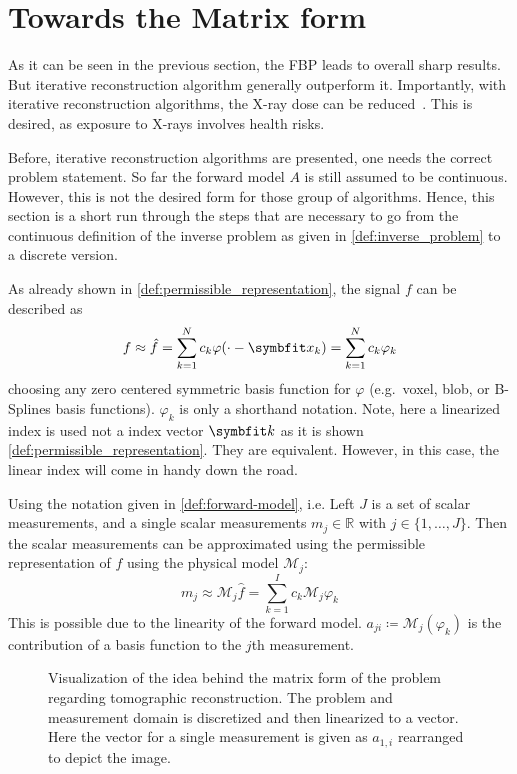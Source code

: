 \section{Towards the Matrix form}\label{sec:matrix_formulation}

As it can be seen in the previous section, the \gls{FBP} leads to overall sharp results. But
iterative reconstruction algorithm generally outperform it. Importantly, with iterative
reconstruction algorithms, the X-ray dose can be reduced~\cite{willemink_evolution_2019}. This is
desired, as exposure to X-rays involves health risks.

Before, iterative reconstruction algorithms are presented, one needs the correct problem statement.
So far the forward model \(A\) is still assumed to be continuous. However, this is not the desired
form for those group of algorithms. Hence, this section is a short run through the steps that are
necessary to go from the continuous definition of the inverse problem as given in
\autoref{def:inverse_problem} to a discrete version.

As already shown in \autoref{def:permissible_representation}, the signal \(f\) can be described as
\begin{equation}
	f \approx \near{f} = \sum_{k=1}^{N} c_k \varphi(\cdot - \mvec{x}_k) = \sum_{k=1}^{N} c_k \varphi_k
\end{equation}
choosing any zero centered symmetric basis function for \(\varphi\) (e.g.\ voxel, blob, or B-Splines
basis functions). \(\varphi_k\) is only a shorthand notation. Note, here a linearized index is used
not a index vector \(\mvec{k}\) as it is shown \autoref{def:permissible_representation}. They are
equivalent. However, in this case, the linear index will come in handy down the road.

Using the notation given in \autoref{def:forward-model}, i.e. Left \(J\) is a set of scalar
measurements, and a single scalar measurements \(m_j \in \mathbb{R}\) with \(j \in \lbrace 1, \dots,
J \rbrace\). Then the scalar measurements can be approximated using the permissible representation
of \(f\) using the physical model \(\mathscr{M}_j\):
\begin{equation}
	m_j \approx \mathscr{M}_j\hat{f} = \sum_{k=1}^{I} c_k \mathscr{M}_j\varphi_k
\end{equation}
This is possible due to the linearity of the forward model. \(a_{ji} \coloneq
\mathscr{M}_j(\varphi_k)\) is the contribution of a basis function to the \(j\)th measurement.

\begin{figure}
	\centering
	\resizebox{0.7\textwidth}{!}{%
		
	}%
	\caption{Visualization of the idea behind the matrix form of the problem regarding
		tomographic reconstruction. The problem and measurement domain is discretized and
		then linearized to a vector. Here the vector for a single measurement is given as
		\(a_{1,i}\) rearranged to depict the image.}\label{fig:matrix_row}
\end{figure}

